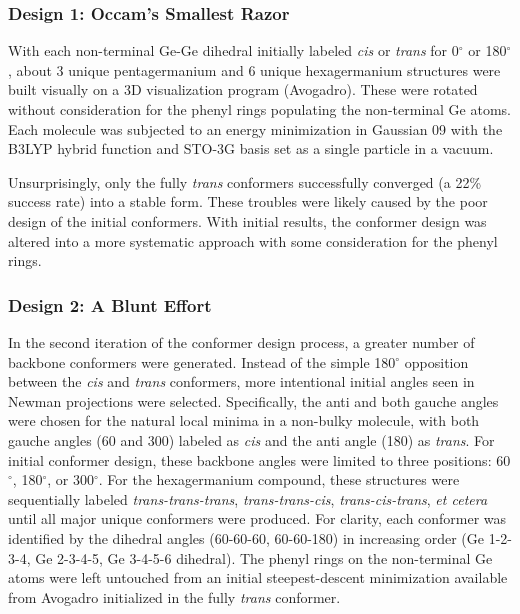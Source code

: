 \subsubsection{Design 1: Occam's Smallest Razor}

With each non-terminal Ge-Ge dihedral initially labeled \textit{cis} or \textit{trans} for 0$^{\circ}$ or 180$^{\circ}$, about 3 unique pentagermanium and 6 unique hexagermanium structures were built visually on a 3D visualization program (Avogadro).
These were rotated without consideration for the phenyl rings populating the non-terminal Ge atoms.
Each molecule was subjected to an energy minimization in Gaussian 09 with the B3LYP hybrid function and STO-3G basis set as a single particle in a vacuum. 

Unsurprisingly, only the fully \textit{trans} conformers successfully converged (a 22\% success rate) into a stable form. 
These troubles were likely caused by the poor design of the initial conformers. 
With initial results, the conformer design was altered into a more systematic approach with some consideration for the phenyl rings.

\subsubsection{Design 2: A Blunt Effort}

In the second iteration of the conformer design process, a greater number of backbone conformers were generated. 
Instead of the simple 180$^{\circ}$ opposition between the \textit{cis} and \textit{trans} conformers, more intentional initial angles seen in Newman projections were selected.
Specifically, the anti and both gauche angles were chosen for the natural local minima in a non-bulky molecule, with both gauche angles (60 and 300) labeled as \textit{cis} and the anti angle (180) as \textit{trans}. 
For initial conformer design, these backbone angles were limited to three positions: 60$^{\circ}$, 180$^{\circ}$, or 300$^{\circ}$.
For the hexagermanium compound, these structures were sequentially labeled \textit{trans-trans-trans}, \textit{trans-trans-cis}, \textit{trans-cis-trans}, \textit{et cetera} until all major unique conformers were produced.
For clarity, each conformer was identified by the dihedral angles (60-60-60, 60-60-180) in increasing order (Ge 1-2-3-4, Ge 2-3-4-5, Ge 3-4-5-6 dihedral).
The phenyl rings on the non-terminal Ge atoms were left untouched from an initial steepest-descent minimization available from Avogadro initialized in the fully \textit{trans} conformer.

